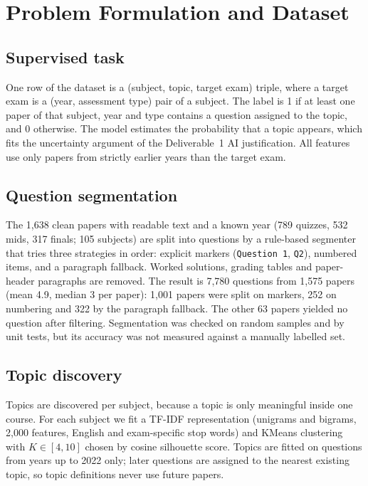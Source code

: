 \documentclass[11pt,a4paper]{article}
\begin{document}
\section{Problem Formulation and Dataset}
\label{sec:data}

\subsection{Supervised task}
One row of the dataset is a (subject, topic, target exam) triple, where a target exam is a (year, assessment type)
pair of a subject. The label is 1 if at least one paper of that subject, year and type contains a question assigned
to the topic, and 0 otherwise. The model estimates the probability that a topic appears, which fits the uncertainty
argument of the Deliverable~1 AI justification. All features use only papers from strictly earlier years than the
target exam.

\subsection{Question segmentation}
The 1{,}638 clean papers with readable text and a known year (789 quizzes, 532 mids, 317 finals; 105 subjects) are
split into questions by a rule-based segmenter that tries three strategies in order: explicit markers
(\texttt{Question 1}, \texttt{Q2}), numbered items, and a paragraph fallback. Worked solutions, grading tables and
paper-header paragraphs are removed. The result is 7{,}780 questions from 1{,}575 papers (mean 4.9, median 3
per paper): 1{,}001 papers were split on markers, 252 on numbering and 322 by the paragraph fallback. The other 63
papers yielded no question after filtering. Segmentation was checked on random samples and by unit tests, but its
accuracy was not measured against a manually labelled set.

\subsection{Topic discovery}
Topics are discovered per subject, because a topic is only meaningful inside one course. For each subject we fit a
TF-IDF representation (unigrams and bigrams, 2{,}000 features, English and exam-specific stop words) and KMeans
clustering with $K \in [4, 10]$ chosen by cosine silhouette score. Topics are fitted on questions from years up to
2022 only; later questions are assigned to the nearest existing topic, so topic definitions never use future papers.
\end{document}
